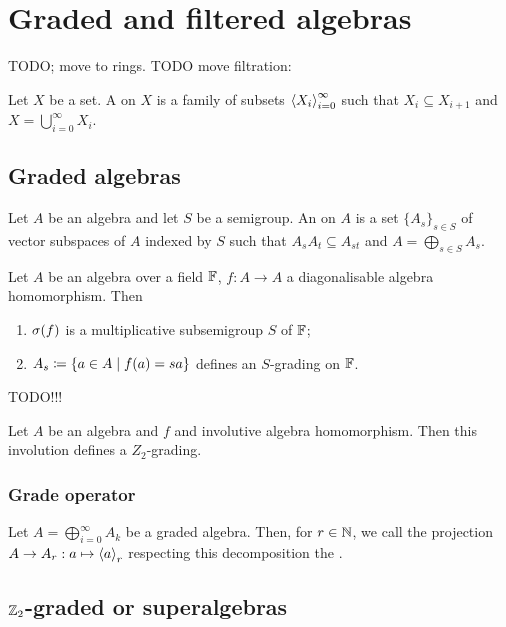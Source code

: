 \section{Graded and filtered algebras}
TODO; move to rings. TODO move filtration:
\begin{definition}
Let $X$ be a set. A  on $X$ is a family of subsets $\left\langle X_i \right\rangle_{i=0}^\infty$ such that $X_i \subseteq X_{i+1}$ and $X = \bigcup_{i=0}^\infty X_i$.
\end{definition}

\subsection{Graded algebras}
\begin{definition}
Let $A$ be an algebra and let $S$ be a semigroup. An  on $A$ is a set $\{A_s\}_{s\in S}$ of vector subspaces of $A$ indexed by $S$ such that $A_sA_t \subseteq A_{st}$ and $A = \bigoplus_{s\in S}A_s$.
\end{definition}


\begin{proposition}
Let $A$ be an algebra over a field $\mathbb{F}$, $f:A\to A$ a diagonalisable algebra homomorphism. Then
\begin{enumerate}
\item $\sigma(f)$ is a multiplicative subsemigroup $S$ of $\mathbb{F}$;
\item $A_s \defeq \setbuilder{a\in A}{f(a) = sa}$ defines an $S$-grading on $\mathbb{F}$.
\end{enumerate}
\end{proposition}
TODO!!!

\begin{corollary}
Let $A$ be an algebra and $f$ and involutive algebra homomorphism. Then this involution defines a $Z_2$-grading.
\end{corollary}

\subsubsection{Grade operator}
\begin{definition}
Let $A = \bigoplus_{i=0}^\infty A_k$ be a graded algebra. Then, for $r\in \mathbb{N}$, we call the projection $A\to A_r: a\mapsto \left\langle a \right\rangle_r$ respecting this decomposition the .
\end{definition}

\subsection{$\mathbb{Z}_2$-graded or superalgebras}

